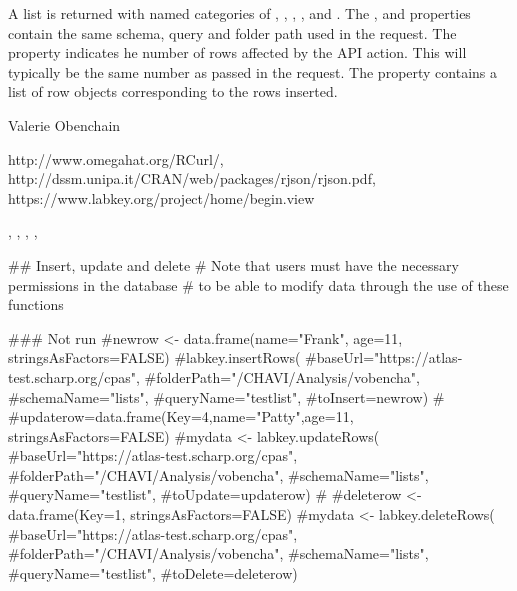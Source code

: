 \documentclass{book}
\begin{document}
\begin{Value}
A list is returned with named categories of , , , ,  and .
The ,  and  properties contain the same schema, query 
and folder path used in the request.  The
 property indicates he number of rows affected by the API action. This will typically be the same
number as passed in the request. The  property contains a list of row objects corresponding to the rows 
inserted.
\end{Value}
\begin{Author}\relax
Valerie Obenchain
\end{Author}
\begin{References}\relax
http://www.omegahat.org/RCurl/,\\ 
http://dssm.unipa.it/CRAN/web/packages/rjson/rjson.pdf,\\
https://www.labkey.org/project/home/begin.view
\end{References}
\begin{SeeAlso}\relax
{}, , , 
, \\
\end{SeeAlso}
\begin{Examples}
\begin{ExampleCode}

## Insert, update and delete
# Note that users must have the necessary permissions in the database
# to be able to modify data through the use of these functions

### Not run
#newrow <- data.frame(name="Frank", age=11, stringsAsFactors=FALSE)
#labkey.insertRows(
#baseUrl="https://atlas-test.scharp.org/cpas", 
#folderPath="/CHAVI/Analysis/vobencha", 
#schemaName="lists", 
#queryName="testlist", 
#toInsert=newrow)
#
#updaterow=data.frame(Key=4,name="Patty",age=11, stringsAsFactors=FALSE)
#mydata <- labkey.updateRows(
#baseUrl="https://atlas-test.scharp.org/cpas", 
#folderPath="/CHAVI/Analysis/vobencha", 
#schemaName="lists", 
#queryName="testlist", 
#toUpdate=updaterow)
#
#deleterow <- data.frame(Key=1, stringsAsFactors=FALSE)
#mydata <- labkey.deleteRows(
#baseUrl="https://atlas-test.scharp.org/cpas", 
#folderPath="/CHAVI/Analysis/vobencha", 
#schemaName="lists", 
#queryName="testlist", 
#toDelete=deleterow)

\end{ExampleCode}
\end{Examples}
\end{document}
